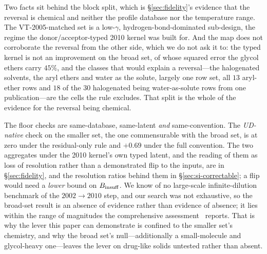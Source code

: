 Two facts sit behind the block split, which is \S\ref{sec:fidelity}'s evidence that the reversal is
chemical and neither the profile database nor the temperature range. The VT-2005-matched set is a
low-$\gamma$, hydrogen-bond-dominated sub-design, the regime the donor/acceptor-typed 2010 kernel was
built for. And the map does not corroborate the reversal from the other side, which we do not ask it
to: the typed kernel is not an improvement on the broad set, of whose
squared error the glycol ethers carry $45\%$, and the classes that would explain a reversal---the
halogenated solvents, the aryl ethers and water as the solute, largely one row set, all $13$
aryl-ether rows and $18$ of the $30$ halogenated being water-as-solute rows from one
publication---are the cells the rule excludes. That split is the whole of the evidence for the
reversal being chemical.

The floor checks are same-database, same-latent \emph{and} same-convention. The \emph{UD-native}
check on the smaller set, the one commensurable with the broad set, is at zero under the residual-only
rule and $+0.69$ under the full convention. The two aggregates under the 2010 kernel's own typed
latent, and the reading of them as loss of resolution rather than a demonstrated flip to the inputs,
are in \S\ref{sec:fidelity}, and the resolution ratios behind them in
\S\ref{sec:si-correctable}; a flip would need a \emph{lower} bound on
$B_{\mathrm{insuff}}$. We know of no large-scale infinite-dilution benchmark of the $2002\to2010$ step, and our
search was not exhaustive, so the broad-set result is an absence of evidence rather than evidence of
absence; it lies within the range of magnitudes the comprehensive
assessment~\cite{fingerhut2017} reports. That is why the lever this paper can demonstrate is
confined to the smaller set's chemistry, and why the broad set's null---additionally a
small-molecule and glycol-heavy one---leaves the lever on drug-like solids untested rather than
absent.

